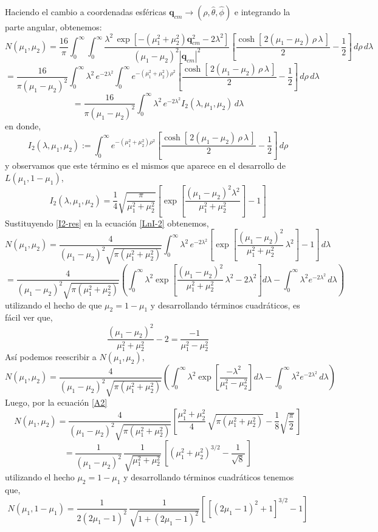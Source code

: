 \documentclass[12pt]{book}
\numberwithin{equation}{chapter}
\def\q{\mathbf{q}}
\def\t{\theta}
\def\r{\rho}
\def\p{\phi}
\def\l{\lambda}
\begin{document}
\newpage

Haciendo el cambio a coordenadas esf\'ericas $\q_{cm} \rightarrow (\r,\hat{\t},\hat{\p}) $ e integrando la parte angular, obtenemos:
$$N(\mu_{1},\mu_{2})= \frac{16}{\pi} \int_{0}^{\infty} \int_{0}^{\infty} \frac{\l^{2} \, \exp \left[ -(\mu_{1}^{2}+\mu_{2}^{2})\q_{cm}^{2} -2\l^{2} \right] }{(\mu_{1}-\mu_{2})^{2} |\q_{cm}|^{2}} \left[ \frac{ \cosh [\, 2(\mu_{1}-\mu_{2})\, \r \, \l \,] }{2} - \frac{1}{2} \right] \, d\r \,d\l   $$
$$=\frac{16}{\pi (\mu_{1}-\mu_{2})^{2}} \int_{0}^{\infty} \l^{2} \, e^{-2\l^{2}} \int_{0}^{\infty} e^{-(\mu_{1}^{2}+\mu_{2}^{2})\r^{2} } \left[ \frac{ \cosh [\, 2(\mu_{1}-\mu_{2})\, \r \, \l \,] }{2} - \frac{1}{2} \right] \, d\r \, d\l $$
\begin{equation}\label{LnI-2}
= \frac{16}{\pi (\mu_{1}-\mu_{2})^{2}} \int_{0}^{\infty} \l^{2} \, e^{-2\l^{2}} I_{2}(\l ,\mu_{1},\mu_{2})   \, d\l
\end{equation}
en donde,
$$ I_{2}(\l ,\mu_{1},\mu_{2}) := \int_{0}^{\infty} e^{-(\mu_{1}^{2}+\mu_{2}^{2})\r^{2} } \left[ \frac{ \cosh [\, 2(\mu_{1}-\mu_{2})\, \r \, \l \,] }{2} - \frac{1}{2} \right] \, d\r $$
y observamos que este t\'ermino es el mismos que aparece en el desarrollo de $L(\mu_{1},1-\mu_{1})$,
$$I_{2}(\l ,\mu_{1},\mu_{2}) =\frac{1}{4} \sqrt{ \frac{\pi}{\mu_{1}^{2}+\mu_{2}^{2}}} \left[ \exp\left[ \frac{(\mu_{1}-\mu_{2})^{2} \l^{2}}{\mu_{1}^{2}+\mu_{2}^{2}} \right] - 1 \right] $$
Sustituyendo \eqref{I2-res} en la ecuaci\'on \eqref{LnI-2} obtenemos,
$$ N(\mu_{1},\mu_{2})=\frac{4}{(\mu_{1}-\mu_{2})^{2} \sqrt{\pi(\mu_{1}^{2}+\mu_{2}^{2}) }} \int_{0}^{\infty} \l^{2} \,e^{-2\l^{2}} \left[ \exp\left[ \frac{(\mu_{1}-\mu_{2})^{2} }{\mu_{1}^{2}+\mu_{2}^{2}}\,\l^{2} \right] - 1 \right] \, d\l $$
$$=\frac{4}{(\mu_{1}-\mu_{2})^{2} \sqrt{\pi(\mu_{1}^{2}+\mu_{2}^{2}) }} \left( \int_{0}^{\infty} \l^{2} \exp\left[ \frac{(\mu_{1}-\mu_{2})^{2} }{\mu_{1}^{2}+\mu_{2}^{2}}\, \l^{2} - 2\l^{2} \right]  d\l - \int_{0}^{\infty} \l^{2} e^{-2\l^{2}} \,d\l \right) $$
utilizando el hecho de que $ \mu_{2}= 1-\mu_{1} $ y desarrollando t\'erminos cuadr\'aticos, es f\'acil ver que,
$$ \frac{(\mu_{1}-\mu_{2})^{2} }{\mu_{1}^{2}+\mu_{2}^{2}} -2= \frac{-1}{\mu_{1}^{2}-\mu_{2}^{2}} $$
As\'i podemos reescribir a $N(\mu_{1},\mu_{2})$,
$$ N(\mu_{1},\mu_{2})= \frac{4}{(\mu_{1}-\mu_{2})^{2} \sqrt{\pi(\mu_{1}^{2}+\mu_{2}^{2}) }} \left( \int_{0}^{\infty} \l^{2} \exp \left[ \frac{-\l^{2} }{\mu_{1}^{2}-\mu_{2}^{2}} \right]  d\l - \int_{0}^{\infty} \l^{2} e^{-2\l^{2}} \,d\l \right) $$
Luego, por la ecuaci\'on \eqref{A2} 
$$ N(\mu_{1},\mu_{2})= \frac{4}{(\mu_{1}-\mu_{2})^{2} \sqrt{\pi(\mu_{1}^{2}+\mu_{2}^{2}) }}  \left[  \frac{\mu_{1}^{2}+\mu_{2}^{2}}{4}\, \sqrt{\pi (\mu_{1}^{2}+\mu_{2}^{2})} - \frac{1}{8}\sqrt{\frac{\pi}{2}} \, \right] $$
$$= \frac{1}{(\mu_{1}-\mu_{2})^{2}}\, \frac{1}{\sqrt{\mu_{1}^{2}+\mu_{2}^{2}}} \,\left[  (\mu_{1}^{2}+\mu_{2}^{2})^{3/2} - \frac{1}{\sqrt{8}} \, \right]$$ 
utilizando el hecho $ \mu_{2}= 1-\mu_{1} $ y desarrollando t\'erminos cuadr\'aticos  tenemos que,
$$ N(\mu_{1},1-\mu_{1})= \frac{1}{2(2\mu_{1}-1)^{2}}\,\frac{1}{\sqrt{ 1+(2\mu_{1}-1)^{2} }} \left[ \,[ (2\mu_{1}-1)^{2}+1 ]^{3/2} -1 \right] $$
\end{document}
